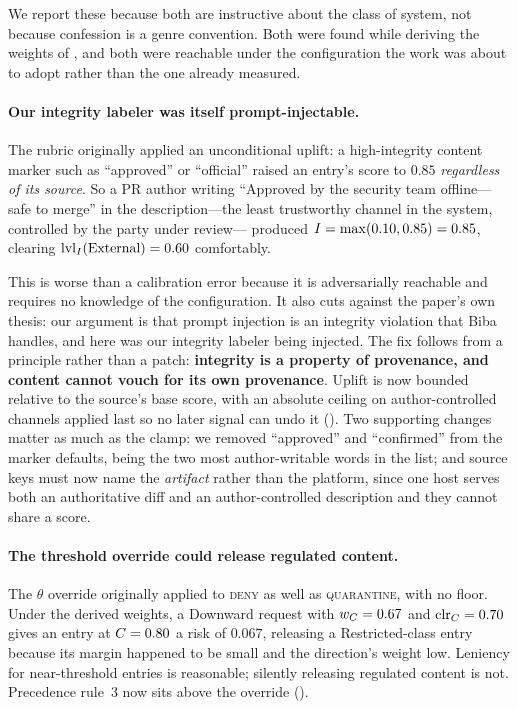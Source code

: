 We report these because both are instructive about the class of system, not
because confession is a genre convention. Both were found while deriving the
weights of , and both were reachable under the
configuration the work was about to adopt rather than the one already measured.

\paragraph{Our integrity labeler was itself prompt-injectable.} The rubric
originally applied an unconditional uplift: a high-integrity content marker
such as ``approved'' or ``official'' raised an entry's score to $0.85$
\emph{regardless of its source}. So a PR author writing ``Approved by the
security team offline---safe to merge'' in the description---the least
trustworthy channel in the system, controlled by the party under review---
produced $I = \max(0.10, 0.85) = 0.85$, clearing $\mathrm{lvl}_I(\text{External}) =
0.60$ comfortably.

This is worse than a calibration error because it is adversarially reachable
and requires no knowledge of the configuration. It also cuts against the
paper's own thesis: our argument is that prompt injection is an integrity
violation that Biba handles, and here was our integrity labeler being
injected. The fix follows from a principle rather than a patch:
\textbf{integrity is a property of provenance, and content cannot vouch for
its own provenance}. Uplift is now bounded relative to the source's base score,
with an absolute ceiling on author-controlled channels applied last so no later
signal can undo it (). Two supporting changes matter as
much as the clamp: we removed ``approved'' and ``confirmed'' from the marker
defaults, being the two most author-writable words in the list; and source keys
must now name the \emph{artifact} rather than the platform, since one host
serves both an authoritative diff and an author-controlled description and they
cannot share a score.

\paragraph{The threshold override could release regulated content.} The
$\theta$ override originally applied to \textsc{deny} as well as
\textsc{quarantine}, with no floor. Under the derived weights, a Downward
request with $w_C = 0.67$ and $\mathrm{clr}_C = 0.70$ gives an entry at $C = 0.80$ a
risk of $0.067$, releasing a Restricted-class entry because its margin happened
to be small and the direction's weight low. Leniency for near-threshold entries
is reasonable; silently releasing regulated content is not. Precedence rule~3
now sits above the override ().

